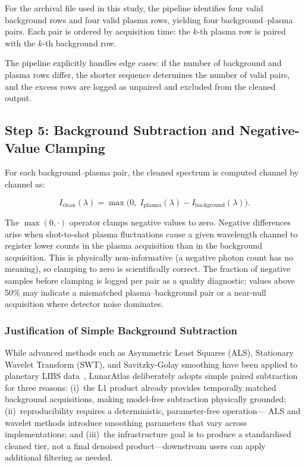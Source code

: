 \documentclass[a4paper,twocolumn,10pt]{article}
\begin{document}
For the archival file used in this study, the pipeline identifies
four valid background rows and four valid plasma rows, yielding four
background--plasma pairs.  Each pair is ordered by acquisition time:
the $k$-th plasma row is paired with the $k$-th background row.

The pipeline explicitly handles edge cases: if the number of
background and plasma rows differ, the shorter sequence determines the
number of valid pairs, and the excess rows are logged as unpaired and
excluded from the cleaned output.

\subsection{Step 5: Background Subtraction and Negative-Value Clamping}

For each background--plasma pair, the cleaned spectrum is computed
channel by channel as:

\begin{equation}
\label{eq:subtraction}
I_{\text{clean}}(\lambda) =
  \max\!\bigl(0,\;
  I_{\text{plasma}}(\lambda) - I_{\text{background}}(\lambda)
  \bigr).
\end{equation}

The $\max(0, \cdot)$ operator clamps negative values to zero.
Negative differences arise when shot-to-shot plasma fluctuations cause
a given wavelength channel to register lower counts in the plasma
acquisition than in the background acquisition.  This is physically
non-informative (a negative photon count has no meaning), so clamping
to zero is scientifically correct.  The fraction of negative samples
before clamping is logged per pair as a quality diagnostic; values
above 50\% may indicate a mismatched plasma--background pair or
a near-null acquisition where detector noise dominates.

\subsubsection{Justification of Simple Background Subtraction}

While advanced methods such as Asymmetric Least Squares (ALS), Stationary
Wavelet Transform (SWT), and Savitzky-Golay smoothing have been applied
to planetary LIBS data~\cite{Clegg2017,Anderson2022,Sridhar2025}, LunarAtlas
deliberately adopts simple paired subtraction for three reasons:
(i)~the L1 product already provides temporally matched background
acquisitions, making model-free subtraction physically grounded;
(ii)~reproducibility requires a deterministic, parameter-free operation---
ALS and wavelet methods introduce smoothing parameters that vary across
implementations; and (iii)~the infrastructure goal is to produce a
standardised cleaned tier, not a final denoised product---downstream users
can apply additional filtering as needed.
\end{document}
